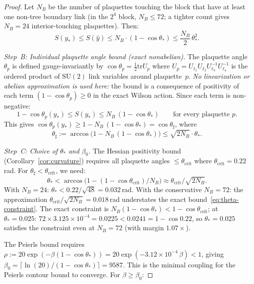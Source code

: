 \documentclass[11pt]{article}
\theoremstyle{definition}
\newcommand{\SU}{\mathrm{SU}}
\newcommand{\tr}{\mathrm{tr}}
\begin{document}
\begin{proof}
Let $N_B$ be the number of plaquettes touching the block
that have at least one non-tree boundary link (in the $2^4$
block, $N_B\le 72$; a tighter count gives $N_B=24$
interior-touching plaquettes).  Then:
\begin{equation}\label{eq:action-compare}
S(y_*)\le S(\hat{y})\le N_B\cdot(1-\cos\theta_*)
\le\frac{N_B}{2}\,\theta_*^2.
\end{equation}

\emph{Step~B: Individual plaquette angle bound (exact nonabelian).}
The plaquette angle $\theta_p$ is defined gauge-invariantly by
$\cos\theta_p=\frac{1}{2}\tr U_p$ where
$U_p=U_{\ell_1}U_{\ell_2}U_{\ell_3}^{-1}U_{\ell_4}^{-1}$
is the ordered product of $\SU(2)$ link variables around
plaquette~$p$.
\emph{No linearization or abelian approximation is used here:}
the bound is a consequence of positivity of each term
$(1-\cos\theta_p)\ge 0$ in the exact Wilson action.
Since each term is non-negative:
\begin{equation}\label{eq:individual-plaq}
1-\cos\theta_p(y_*)\le S(y_*)\le N_B\,(1-\cos\theta_*)
\qquad\text{for every plaquette }p.
\end{equation}
This gives $\cos\theta_p(y_*)\ge 1-N_B\,(1-\cos\theta_*)
=\cos\theta_\sharp$, where
\begin{equation}\label{eq:tsharp}
\theta_\sharp:=\arccos\bigl(1-N_B\,(1-\cos\theta_*)\bigr)
\le\sqrt{2N_B}\cdot\theta_*.
\end{equation}

\emph{Step~C: Choice of $\theta_*$ and $\beta_0$.}
The Hessian positivity bound
(Corollary~\ref{cor:curvature}) requires all plaquette angles
$\le\theta_{\mathrm{crit}}$ where
$\theta_{\mathrm{crit}}=0.22$\,rad.
For $\theta_\sharp<\theta_{\mathrm{crit}}$, we need:
\begin{equation}\label{eq:theta-constraint}
\theta_*<\arccos\bigl(1-(1-\cos\theta_{\mathrm{crit}})/N_B\bigr)
\approx\theta_{\mathrm{crit}}/\sqrt{2N_B}.
\end{equation}
With $N_B=24$: $\theta_*<0.22/\sqrt{48}=0.032$\,rad.
With the conservative $N_B=72$:
the approximation $\theta_{\mathrm{crit}}/\sqrt{2N_B}=0.018$\,rad
understates the exact bound~\eqref{eq:theta-constraint}.
The exact constraint is $N_B(1-\cos\theta_*)<1-\cos\theta_{\mathrm{crit}}$;
at $\theta_*=0.025$: $72\times 3.125\times 10^{-4}=0.0225<0.0241
=1-\cos 0.22$, so $\theta_*=0.025$ satisfies the constraint
even at $N_B=72$ (with margin $1.07\times$).

The Peierls bound requires
$\rho:=20\exp(-\beta(1-\cos\theta_*))
=20\exp(-3.12\times 10^{-4}\,\beta)<1$,
giving $\beta_0=\lceil\ln(20)/(1-\cos\theta_*)\rceil=9587$.
This is the minimal coupling for the Peierls contour bound
to converge.  For $\beta\ge\beta_0$:


\end{proof}
\end{document}
